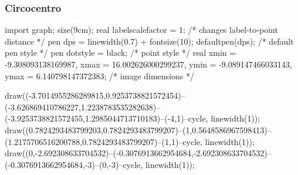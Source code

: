 \documentclass[11pt]{scrartcl}
\begin{document}
	\subsubsection{Circocentro}
	\begin{center}
		\begin{asy}
			import graph; size(9cm); 
			real labelscalefactor = 1; /* changes label-to-point distance */
			pen dps = linewidth(0.7) + fontsize(10); defaultpen(dps); /* default pen style */ 
			pen dotstyle = black; /* point style */ 
			real xmin = -9.308093138169987, xmax = 16.002626000299237, ymin = -9.089147466033143, ymax = 6.140798147372383;  /* image dimensions */
			
			
			draw((-3.7014955286289815,0.9253738821572454)--(-3.626869410786227,1.2238783535282638)--(-3.9253738821572455,1.2985044713710183)--(-4,1)--cycle, linewidth(1)); 
			draw((0.7824293483799203,0.7824293483799207)--(1,0.5648586967598413)--(1.2175706516200788,0.7824293483799207)--(1,1)--cycle, linewidth(1)); 
			draw((0,-2.692308633704532)--(-0.3076913662954684,-2.692308633704532)--(-0.3076913662954684,-3)--(0,-3)--cycle, linewidth(1)); 


\end{asy}
\end{center}
\end{document}
